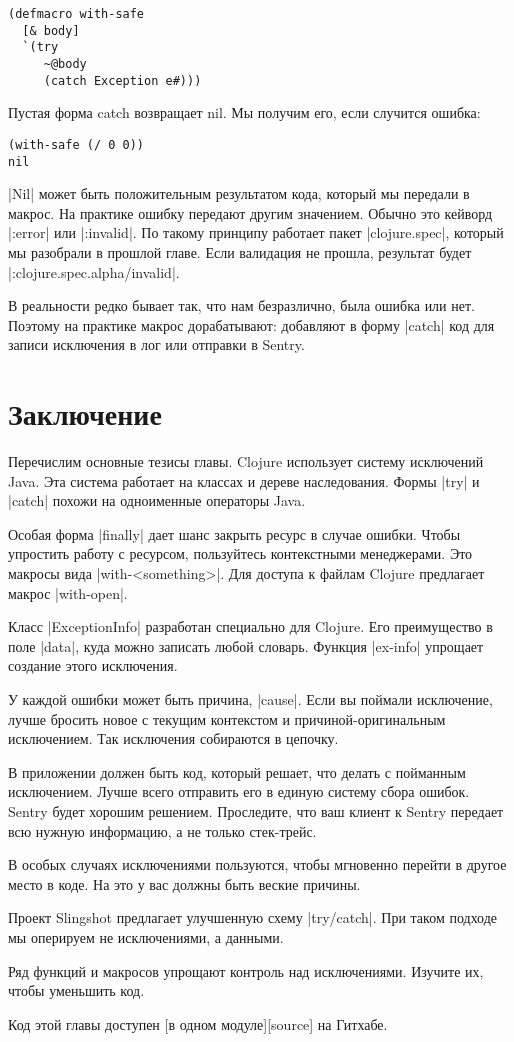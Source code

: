 \begin{verbatim}
(defmacro with-safe
  [& body]
  `(try
     ~@body
     (catch Exception e#)))
\end{verbatim}

Пустая форма catch возвращает nil. Мы получим его, если случится ошибка:

\begin{verbatim}
(with-safe (/ 0 0))
nil
\end{verbatim}

\spverb|Nil| может быть положительным результатом кода, который мы передали в
макрос. На практике ошибку передают другим значением. Обычно это кейворд
\spverb|:error| или \spverb|:invalid|. По такому принципу работает пакет \spverb|clojure.spec|,
который мы разобрали в прошлой главе. Если валидация не прошла, результат будет
\spverb|:clojure.spec.alpha/invalid|.

В реальности редко бывает так, что нам безразлично, была ошибка или нет. Поэтому
на практике макрос дорабатывают: добавляют в форму \spverb|catch| код для записи
исключения в лог или отправки в Sentry.

\section{Заключение}

Перечислим основные тезисы главы. Clojure использует систему исключений
Java. Эта система работает на классах и дереве наследования. Формы \spverb|try| и
\spverb|catch| похожи на одноименные операторы Java.

Особая форма \spverb|finally| дает шанс закрыть ресурс в случае ошибки. Чтобы упростить
работу с ресурсом, пользуйтесь контекстными менеджерами. Это макросы вида
\spverb|with-<something>|. Для доступа к файлам Clojure предлагает макрос \spverb|with-open|.

Класс \spverb|ExceptionInfo| разработан специально для Clojure. Его преимущество в поле
\spverb|data|, куда можно записать любой словарь. Функция \spverb|ex-info| упрощает создание
этого исключения.

У каждой ошибки может быть причина, \spverb|cause|. Если вы поймали исключение, лучше
бросить новое с текущим контекстом и причиной-оригинальным исключением. Так
исключения собираются в цепочку.

В приложении должен быть код, который решает, что делать с пойманным
исключением. Лучше всего отправить его в единую систему сбора ошибок. Sentry
будет хорошим решением. Проследите, что ваш клиент к Sentry передает всю нужную
информацию, а не только стек-трейс.

В особых случаях исключениями пользуются, чтобы мгновенно перейти в другое место
в коде. На это у вас должны быть веские причины.

Проект Slingshot предлагает улучшенную схему \spverb|try/catch|. При таком подходе мы
оперируем не исключениями, а данными.

Ряд функций и макросов упрощают контроль над исключениями. Изучите их, чтобы
уменьшить код.


Код этой главы доступен [в одном модуле][source] на Гитхабе.
